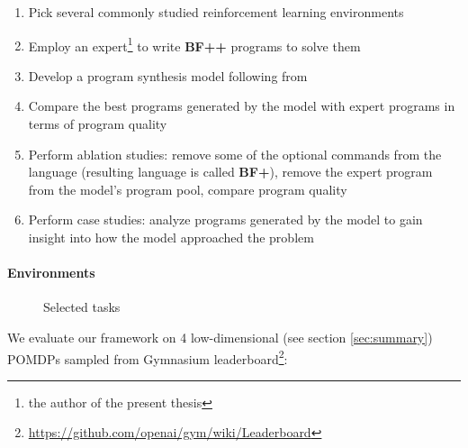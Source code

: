 \begin{enumerate}
    \item Pick several commonly studied reinforcement learning environments
    \item Employ an expert\footnote{the author of the present thesis} to write \textbf{BF++} programs to solve them
    \item Develop a program synthesis model following from \cite{abolafiaNeuralProgramSynthesis2018}
    \item Compare the best programs generated by the model with expert programs in terms of program quality
    \item Perform ablation studies: remove some of the optional commands from the language (resulting language is called \textbf{BF+}), remove the expert program from the model's program pool, compare program quality
    \item Perform case studies: analyze programs generated by the model to gain insight into how the model approached the problem
\end{enumerate}

\paragraph{Environments}
\label{sec:envs}

\begin{figure}
    \centering
    \caption{Selected tasks}
    \label{fig:envs}
\end{figure}

We evaluate our framework on 4 low-dimensional (see section \ref{sec:summary}) POMDPs sampled from Gymnasium \cite{towersGymnasiumStandardInterface2024} leaderboard\footnote{\url{https://github.com/openai/gym/wiki/Leaderboard}}:

